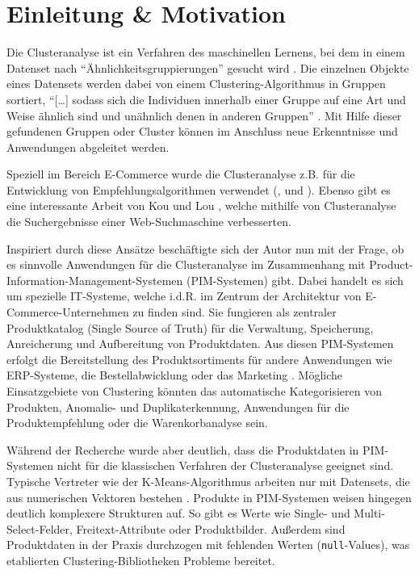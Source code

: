 \hypertarget{einleitung-motivation}{%
\section{Einleitung \& Motivation}\label{einleitung-motivation}}

Die Clusteranalyse ist ein Verfahren des maschinellen Lernens, bei dem
in einem Datenset nach ``Ähnlichkeitsgruppierungen'' gesucht wird
\autocite[Kap. 5.2.3 Unüberwachtes Lernen]{papp2019}. Die einzelnen
Objekte eines Datensets werden dabei von einem Clustering-Algorithmus in
Gruppen sortiert, ``{[}\ldots{]} sodass sich die Individuen innerhalb
einer Gruppe auf eine Art und Weise ähnlich sind und unähnlich denen in
anderen Gruppen'' \autocite[Kap. 1.1 What Is a Cluster?]{king2015}. Mit
Hilfe dieser gefundenen Gruppen oder Cluster können im Anschluss neue
Erkenntnisse und Anwendungen abgeleitet werden. \autocite[Kap. 5.2.3
Unüberwachtes Lernen]{papp2019}

Speziell im Bereich E-Commerce wurde die Clusteranalyse z.B. für die
Entwicklung von Empfehlungsalgorithmen verwendet (\autocite{oh2019},
\autocite{cui2021} und \autocite{kumar2001}). Ebenso gibt es eine
interessante Arbeit von Kou und Lou \autocite{kou2012}, welche mithilfe
von Clusteranalyse die Suchergebnisse einer Web-Suchmaschine
verbesserten.

Inspiriert durch diese Ansätze beschäftigte sich der Autor nun mit der
Frage, ob es sinnvolle Anwendungen für die Clusteranalyse im
Zusammenhang mit Product-Information-Management-Systemen (PIM-Systemen)
gibt. Dabei handelt es sich um spezielle IT-Systeme, welche i.d.R. im
Zentrum der Architektur von E-Commerce-Unternehmen zu finden sind. Sie
fungieren als zentraler Produktkatalog (Single Source of Truth) für die
Verwaltung, Speicherung, Anreicherung und Aufbereitung von Produktdaten.
Aus diesen PIM-Systemen erfolgt die Bereitstellung des Produktsortiments
für andere Anwendungen wie ERP-Systeme, die Bestellabwicklung oder das
Marketing \autocite{pimcore2021}. Mögliche Einsatzgebiete von Clustering
könnten das automatische Kategorisieren von Produkten, Anomalie- und
Duplikaterkennung, Anwendungen für die Produktempfehlung oder die
Warenkorbanalyse sein.

Während der Recherche wurde aber deutlich, dass die Produktdaten in
PIM-Systemen nicht für die klassischen Verfahren der Clusteranalyse
geeignet sind. Typische Vertreter wie der K-Means-Algorithmus arbeiten
nur mit Datensets, die aus numerischen Vektoren bestehen
\autocite{huang1998}. Produkte in PIM-Systemen weisen hingegen deutlich
komplexere Strukturen auf. So gibt es Werte wie Single- und
Multi-Select-Felder, Freitext-Attribute oder Produktbilder. Außerdem
sind Produktdaten in der Praxis durchzogen mit fehlenden Werten
(\texttt{null}-Values), was etablierten Clustering-Bibliotheken Probleme
bereitet. \autocite{sklearn2022}

